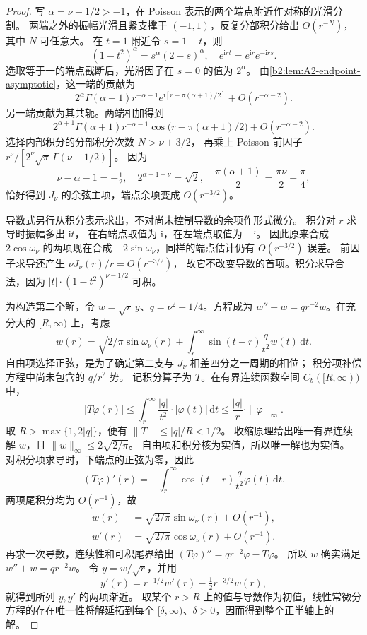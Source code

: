 \begin{proof}
写 \(\alpha=\nu-1/2>-1\)，在 Poisson 表示的两个端点附近作对称的光滑分割。
两端之外的振幅光滑且紧支撑于 \((-1,1)\)，反复分部积分给出
\(O(r^{-N})\)，其中 \(N\) 可任意大。
在 \(t=1\) 附近令 \(s=1-t\)，则
\[
 (1-t^2)^\alpha=s^\alpha(2-s)^\alpha,\quad
 e^{\mathrm irt}=e^{\mathrm ir}e^{-\mathrm irs}.
\]
选取等于一的端点截断后，光滑因子在 \(s=0\) 的值为 \(2^\alpha\)。
由\cref{b2:lem:A2-endpoint-asymptotic}，这一端的贡献为
\[
 2^\alpha\Gamma(\alpha+1)r^{-\alpha-1}
 e^{\mathrm i[r-\pi(\alpha+1)/2]}+O(r^{-\alpha-2}).
\]
另一端贡献为其共轭。两端相加得到
\[
 2^{\alpha+1}\Gamma(\alpha+1)r^{-\alpha-1}
 \cos\bigl(r-\pi(\alpha+1)/2\bigr)+O(r^{-\alpha-2}).
\]
选择内部积分的分部积分次数 \(N>\nu+3/2\)，
再乘上 Poisson 前因子
\(r^\nu/[2^\nu\sqrt\pi\,\Gamma(\nu+1/2)]\)。
因为
\[
 \nu-\alpha-1=-\tfrac12,\quad
 2^{\alpha+1-\nu}=\sqrt2,\quad
 \frac{\pi(\alpha+1)}2=\frac{\pi\nu}2+\frac\pi4,
\]
恰好得到 \(J_\nu\) 的余弦主项，端点余项变成 \(O(r^{-3/2})\)。

导数式另行从积分表示求出，不对尚未控制导数的余项作形式微分。
积分对 \(r\) 求导时振幅多出 \(\mathrm it\)，
在右端点取值为 \(\mathrm i\)，在左端点取值为 \(-\mathrm i\)。
因此原来合成 \(2\cos\omega_\nu\) 的两项现在合成
\(-2\sin\omega_\nu\)，同样的端点估计仍有 \(O(r^{-3/2})\) 误差。
前因子求导还产生 \(\nu J_\nu(r)/r=O(r^{-3/2})\)，
故它不改变导数的首项。积分求导合法，因为
\(|t|\cdot(1-t^2)^{\nu-1/2}\) 可积。

为构造第二个解，令 \(w=\sqrt r\,y\)、\(q=\nu^2-1/4\)。方程成为 \(w''+w=q r^{-2}w\)。在充分大的 \([R,\infty)\) 上，考虑
\[
 w(r)=\sqrt{2/\pi}\sin\omega_\nu(r)
 +\int_r^\infty\sin(t-r)\frac q{t^2}w(t)\,\mathrm dt.
\]
自由项选择正弦，是为了确定第二支与 \(J_\nu\) 相差四分之一周期的相位；
积分项补偿方程中尚未包含的 \(q/r^2\) 势。
记积分算子为 \(T\)。在有界连续函数空间 \(C_b([R,\infty))\) 中，
\[
 |T\varphi(r)|\leq
 \int_r^\infty\frac{|q|}{t^2}\cdot|\varphi(t)|\,\mathrm dt
 \leq\frac{|q|}{r}\cdot\|\varphi\|_\infty.
\]
取 \(R>\max\{1,2|q|\}\)，便有 \(\|T\|\leq|q|/R<1/2\)。
收缩原理给出唯一有界连续解 \(w\)，且
\(\|w\|_\infty\leq2\sqrt{2/\pi}\)。
自由项和积分核为实值，所以唯一解也为实值。
对积分项求导时，下端点的正弦为零，因此
\[
 (T\varphi)'(r)
 =-\int_r^\infty\cos(t-r)\frac q{t^2}\varphi(t)\,\mathrm dt.
\]
两项尾积分均为 \(O(r^{-1})\)，故
\[
 \begin{aligned}
 w(r)&=\sqrt{2/\pi}\sin\omega_\nu(r)+O(r^{-1}),\\
 w'(r)&=\sqrt{2/\pi}\cos\omega_\nu(r)+O(r^{-1}).
 \end{aligned}
\]
再求一次导数，连续性和可积尾界给出
\((T\varphi)''=qr^{-2}\varphi-T\varphi\)。
所以 \(w\) 确实满足 \(w''+w=qr^{-2}w\)。
令 \(y=w/\sqrt r\)，并用
\[
 y'(r)=r^{-1/2}w'(r)-\tfrac12r^{-3/2}w(r),
\]
就得到所列 \(y,y'\) 的两项渐近。
取某个 \(r>R\) 上的值与导数作为初值，线性常微分方程的存在唯一性将解延拓到每个
\([\delta,\infty)\)、\(\delta>0\)，因而得到整个正半轴上的解。


\end{proof}
